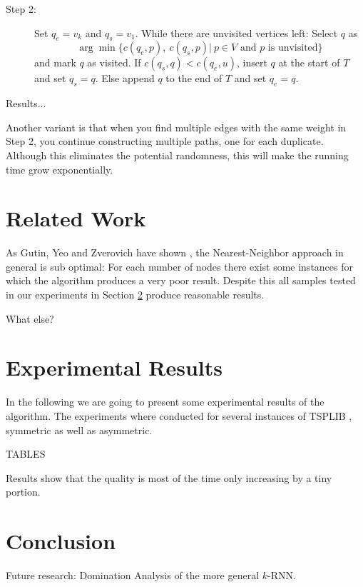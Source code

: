 \documentclass[11pt]{article}
\begin{document}
	\begin{description}
		\item[Step 2:] Set $q_e = v_k$ and $q_s = v_1$. 
		While there are unvisited vertices left: 
		Select $q$ as 
		\[
		\arg \min\{c(q_e, p),\ c(q_s, p) |\ p \in V \text{ and $p$ is unvisited}\}
		\] 
		and mark $q$ as visited. If $c(q_s, q) < c (q_e, u)$, insert $q$ at the start of $T$ and set $q_s = q$. Else append $q$ to the end of $T$ and set $q_e = q$.
	\end{description}

	Results...
	
	Another variant is that when you find multiple edges with the same weight in Step 2, you continue constructing multiple paths, one for each duplicate. 
	Although this eliminates the potential randomness, this will make the running time grow exponentially.
	 
	\section{Related Work}
	\label{sec:related}
	
	As Gutin, Yeo and Zverovich have shown \cite{GUTIN2002}, the Nearest-Neighbor approach in general is sub optimal: 
	For each number of nodes there exist some instances for which the algorithm produces a very poor result. 
	Despite this all samples tested in our experiments in Section \ref{sec:experimental} produce reasonable results.
	
	What else?
	\section{Experimental Results}
	\label{sec:experimental}
	
	In the following we are going to present some experimental results of the algorithm. The experiments where conducted for several instances of TSPLIB \cite{REINELT1995}, symmetric as well as asymmetric.
	
	TABLES
	
	
	
	
	
	Results show that the quality is most of the time only increasing by a tiny portion.

	
	\section{Conclusion}
	\label{sec:conclusion}
	
	Future research: Domination Analysis of the more general $k$-RNN.
	
	
	
	
\end{document}
